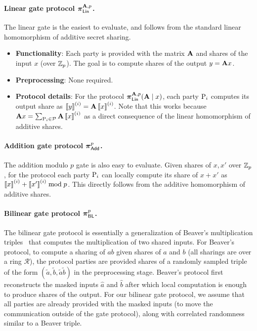 \iffull

\paragraph{Linear gate protocol $\prot_\LMap^{\mat{A}, p}$.}
The linear gate is the easiest to evaluate, and follows from the standard linear homomorphism of additive secret sharing.

\begin{itemize}
  \item \textbf{Functionality}: Each party is provided with the matrix $\mat{A}$ and shares of the input $x$ (over $\mathbb{Z}_p$). The goal is to compute shares of the output $y = \mat{A}x$.

  \item \textbf{Preprocessing}: None required.

  \item \textbf{Protocol details}:
  For the protocol $\prot_\LMap^{\mat{A}, p}(\mat{A} \mid x)$, each party $\textnormal{P}_i$ computes its output share as $\sharei{y} = \mat{A}\sharei{x}$. Note that this works because $\mat{A}x = \sum_{\party_i \in \parties} \mat{A}\sharei{x}$ as a direct consequence of the linear homomorphism of additive shares.
\end{itemize}

\paragraph{Addition gate protocol $\boldsymbol{\pi}_{\textnormal{\textsf{Add}}}^{p}$.}
The addition modulo $p$ gate is also easy to evaluate. Given shares of $x, x'$ over $\mathbb{Z}_p$, for the protocol each party $\textnormal{P}_i$ can locally compute its share of $x+x'$ as $\left\llbracket x \right\rrbracket^{(i)} + \left\llbracket x' \right\rrbracket^{(i)} \bmod p$. This directly follows from the additive homomorphism of additive shares. 

\paragraph{Bilinear gate protocol $\boldsymbol{\pi}_{\textnormal{\textsf{BL}}}^p$.}
The bilinear gate protocol is essentially a generalization of Beaver's multiplication triples~\cite{boyle2019-fss-preprocess,beaver1991-triples} that computes the multiplication of two shared inputs. For Beaver's protocol, to compute a sharing of $ab$ given shares of $a$ and $b$ (all sharings are over a ring $\mathcal{R}$), the protocol parties are provided shares of a randomly sampled triple of the form $(\tilde{a},\tilde{b},\tilde{a}\tilde{b})$ in the preprocessing stage. Beaver's protocol first reconstructs the masked inputs $\hat{a}$ and $\hat{b}$ after which local computation is enough to produce shares of the output. For our bilinear gate protocol, we assume that  all parties are already provided with the masked inputs (to move the communication outside of the gate protocol), along with correlated randomness similar to a Beaver triple. 

